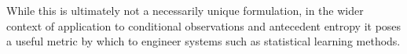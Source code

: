 \documentclass{article}
\begin{document}
While this is ultimately not a necessarily unique formulation, in the wider context of application to conditional observations and antecedent entropy it poses a useful metric by which to engineer systems such as statistical learning methods.



\end{document}
